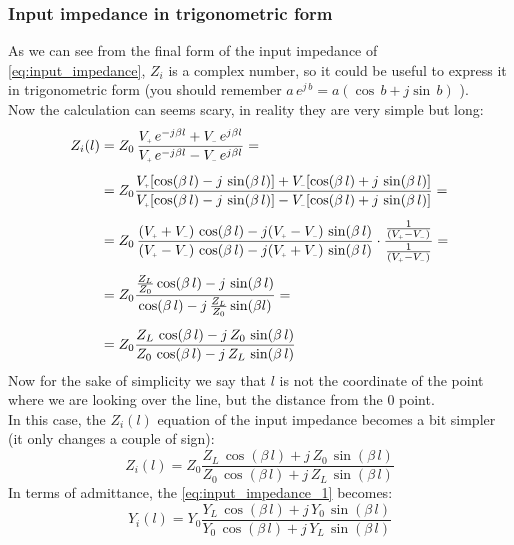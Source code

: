 \subsubsection*{Input impedance in trigonometric form}
As we can see from the final form of the input impedance of \cref{eq:input_impedance}, $Z_i$ is a complex number, so it could be useful to express it in trigonometric form (you should remember $a\,e^{j\,b}=a(\cos\,b+j\sin\,b)$ ).\\
Now the calculation can seems scary, in reality they are very simple but long:
\begin{align}
    \begin{split}
      Z_i(l)&=Z_0\,\frac{V\bottomPlus \,e^{-j\beta l}+V\bottomMinus \,e^{j\beta l}}{V\bottomPlus \,e^{-j\beta l}-V\bottomMinus \,e^{j\beta l}}=\\[5pt]
      &=Z_0\frac{V\bottomPlus [\cos(\beta\, l)-j \, \sin(\beta\, l)]+V\bottomMinus [\cos(\beta\, l)+j \, \sin(\beta\, l)]}{V\bottomPlus [\cos(\beta\, l)-j \, \sin(\beta\, l)]-V\bottomMinus [\cos(\beta\, l)+j \, \sin(\beta\, l)]}=\\[5pt]
      &=Z_0\,\frac{(V\bottomPlus +V\bottomMinus )\,\cos(\beta\,l)-j(V\bottomPlus -V\bottomMinus )\,\sin(\beta\, l)}{(V\bottomPlus -V\bottomMinus )\,\cos(\beta\,l)-j(V\bottomPlus +V\bottomMinus )\,\sin(\beta\, l)}\cdot \frac{\frac{1}{(V\bottomPlus-V\bottomMinus)}}{\frac{1}{(V\bottomPlus-V\bottomMinus)}}=\\[5pt]
      &=Z_0\frac{\frac{Z_L}{Z_0}\cos(\beta\,l)-j\,\sin(\beta \,l)}{\cos(\beta\, l)-j\,\frac{Z_L}{Z_0}\sin(\beta l)}=\\[5pt]
      &=Z_0\frac{Z_L\,\cos(\beta \,l)-j\,Z_0\,\sin(\beta \, l)}{Z_0\, \cos(\beta \, l)-j\,Z_L\,\sin(\beta \, l)}
    \end{split}
\end{align}
Now for the sake of simplicity we say that $l$ is not the coordinate of the point where we are looking over the line, but the distance from the $0$ point.\\
In this case, the $Z_i(l)$ equation of the input impedance becomes a bit simpler (it only changes a couple of sign):
\begin{equation}\label{eq:input_impedance_1}
    Z_i(l)=Z_0\frac{Z_L\,\cos(\beta \,l)+j\,Z_0\,\sin(\beta \, l)}{Z_0\, \cos(\beta \, l)+j\,Z_L\,\sin(\beta \, l)}
\end{equation}
In terms of admittance, the \cref{eq:input_impedance_1} becomes:
\begin{equation}
    Y_i(l)=Y_0\frac{Y_L\,\cos(\beta \,l)+j\,Y_0\,\sin(\beta \, l)}{Y_0\, \cos(\beta \, l)+j\,Y_L\,\sin(\beta \, l)}
\end{equation}

